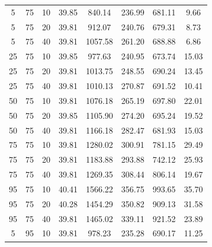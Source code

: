 \begin{table}[H]
\begin{tabular}{ccc|c|c|c|c|c}
5 & 75 & 10 & \cellcolor{gray!50}39.85 & \cellcolor{gray!31}840.14 & \cellcolor{gray!1}236.99 & \cellcolor{gray!44}681.11 & 9.66\\
5 & 75 & 20 & \cellcolor{gray!50}39.81 & \cellcolor{gray!19}912.07 & \cellcolor{gray!1}240.76 & \cellcolor{gray!45}679.31 & 8.73\\
5 & 75 & 40 & \cellcolor{gray!50}39.81 & \cellcolor{gray!1}1057.58 & \cellcolor{gray!1}261.20 & \cellcolor{gray!42}688.88 & 6.86\\
25 & 75 & 10 & \cellcolor{gray!50}39.85 & \cellcolor{gray!8}977.63 & \cellcolor{gray!1}240.95 & \cellcolor{gray!46}673.74 & 15.03\\
25 & 75 & 20 & \cellcolor{gray!50}39.81 & \cellcolor{gray!2}1013.75 & \cellcolor{gray!1}248.55 & \cellcolor{gray!41}690.24 & 13.45\\
25 & 75 & 40 & \cellcolor{gray!50}39.81 & \cellcolor{gray!3}1010.13 & \cellcolor{gray!1}270.87 & \cellcolor{gray!41}691.52 & 10.41\\
50 & 75 & 10 & \cellcolor{gray!50}39.81 & \cellcolor{gray!1}1076.18 & \cellcolor{gray!1}265.19 & \cellcolor{gray!39}697.80 & 22.01\\
50 & 75 & 20 & \cellcolor{gray!50}39.85 & \cellcolor{gray!1}1105.90 & \cellcolor{gray!1}274.20 & \cellcolor{gray!40}695.24 & 19.52\\
50 & 75 & 40 & \cellcolor{gray!50}39.81 & \cellcolor{gray!1}1166.18 & \cellcolor{gray!1}282.47 & \cellcolor{gray!44}681.93 & 15.03\\
75 & 75 & 10 & \cellcolor{gray!50}39.81 & \cellcolor{gray!1}1280.02 & \cellcolor{gray!1}300.91 & \cellcolor{gray!13}781.15 & 29.49\\
75 & 75 & 20 & \cellcolor{gray!50}39.81 & \cellcolor{gray!1}1183.88 & \cellcolor{gray!1}293.88 & \cellcolor{gray!25}742.12 & 25.93\\
75 & 75 & 40 & \cellcolor{gray!50}39.81 & \cellcolor{gray!1}1269.35 & \cellcolor{gray!1}308.44 & \cellcolor{gray!6}806.14 & 19.67\\
95 & 75 & 10 & \cellcolor{gray!44}40.41 & \cellcolor{gray!1}1566.22 & \cellcolor{gray!1}356.75 & \cellcolor{gray!1}993.65 & 35.70\\
95 & 75 & 20 & \cellcolor{gray!46}40.28 & \cellcolor{gray!1}1454.29 & \cellcolor{gray!1}350.82 & \cellcolor{gray!1}909.13 & 31.58\\
95 & 75 & 40 & \cellcolor{gray!50}39.81 & \cellcolor{gray!1}1465.02 & \cellcolor{gray!1}339.11 & \cellcolor{gray!1}921.52 & 23.89\\
5 & 95 & 10 & \cellcolor{gray!50}39.81 & \cellcolor{gray!8}978.23 & \cellcolor{gray!1}235.28 & \cellcolor{gray!41}690.17 & 11.25\\

\end{tabular}
\end{table}
